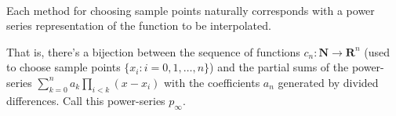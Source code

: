 \documentclass{article}
\begin{document}
    \begin{center}
    \end{center}
    { \hspace*{\fill} \\}
    
    \begin{center}
    \end{center}
    { \hspace*{\fill} \\}
    
    \begin{center}
    \end{center}
    { \hspace*{\fill} \\}
    
    \begin{center}
    \end{center}
    { \hspace*{\fill} \\}
    
    \begin{center}
    \end{center}
    { \hspace*{\fill} \\}
    
    \begin{center}
    \end{center}
    { \hspace*{\fill} \\}
    
    Each method for choosing sample points naturally corresponds with a
power series representation of the function to be interpolated.

That is, there's a bijection between the sequence of functions
\(c_n:\mathbf{N} \to \mathbf{R}^n\) (used to choose sample points
\(\{x_i : i = 0,1,\ldots, n\}\)) and the partial sums of the
power-series \(\sum_{k=0}^{n}a_k \prod_{i< k}(x-x_i)\) with the
coefficients \(a_n\) generated by divided differences. Call this
power-series \(p_\infty\).
\end{document}
